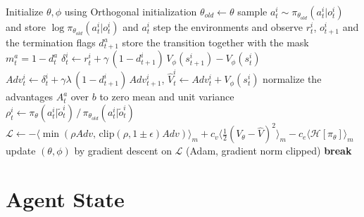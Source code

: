 \begin{algorithm}[t]
\caption{MAPPO}
\label{alg:mappo}
\begin{algorithmic}[1]
\State Initialize $\theta,\phi$ using Orthogonal initialization
    \State $\theta_{old} \gets \theta$ 
     
            \State sample $a^i_t \sim \pi_{\theta_{old}}(a^i_t|o^i_t)$ and store $\log\pi_{\theta_{old}}(a^i_t|o^i_t)$ and $a^i_t$
        \EndFor
        \State step the environments and observe $r^i_t$, $o^i_{t+1}$ and the termination flags $d^a_{t+1}$
        \State store the transition together with the mask $m^a_t = 1 - d^a_t$
    \EndFor
     
         
            \State $\delta^i_t \gets r^i_t + \gamma\,(1-d^i_{t+1})\,V_{\phi}(s^i_{t+1}) - V_{\phi}(s^i_t)$
            \State $Adv^i_t \gets \delta^i_t + \gamma\lambda\,(1-d^i_{t+1})\,Adv^i_{t+1}$, \quad $\hat{V}^i_t \gets Adv^i_t + V_{\phi}(s^i_t)$
        \EndFor
         
            \State normalize the advantages $A^a_t$ over $b$ to zero mean and unit variance
            \State $\rho^i_t \gets \pi_\theta(a^i_t|\tilde{o}^i_t) \,/\, \pi_{\theta_{old}}(a^i_t|\tilde{o}^i_t)$
            \State $\mathcal{L} \gets
                    -\langle \min(\rho Adv,\, \mathrm{clip}(\rho,1\!\pm\!\epsilon)Adv)\rangle_m
                    + c_v \langle \tfrac{1}{2}(V_\theta - \hat{V})^2 \rangle_m
                    - c_e \langle \mathcal{H}[\pi_\theta] \rangle_m$
            \State update $(\theta,\phi)$ by gradient descent on $\mathcal{L}$
                    (Adam, gradient norm clipped)
        \EndFor
            \State \textbf{break} 
        \EndIf
    \EndFor
\EndWhile
\end{algorithmic}
\end{algorithm}

\section{Agent State}

